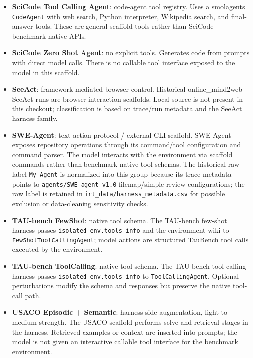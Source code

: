 \begin{itemize}
ScienceAgentBench self-debug scaffold asks the model to write complete Python
programs, then the harness executes/debugs externally and may feed error
messages back. The execution environment is not exposed as callable model
tools.
\item \textbf{SciCode Tool Calling Agent}: code-agent tool registry. Uses a
smolagents \texttt{CodeAgent} with web search, Python interpreter, Wikipedia
search, and final-answer tools. These are general scaffold tools rather than
SciCode benchmark-native APIs.
\item \textbf{SciCode Zero Shot Agent}: no explicit tools. Generates code from
prompts with direct model calls. There is no callable tool interface exposed to
the model in this scaffold.
\item \textbf{SeeAct}: framework-mediated browser control. Historical
online\_mind2web SeeAct runs are browser-interaction scaffolds. Local source is
not present in this checkout; classification is based on trace/run metadata and
the SeeAct harness family.
\item \textbf{SWE-Agent}: text action protocol / external CLI scaffold.
SWE-Agent exposes repository operations through its command/tool configuration
and command parser. The model interacts with the environment via scaffold
commands rather than benchmark-native tool schemas. The historical raw label
\texttt{My Agent} is normalized into this group because its trace metadata
points to \texttt{agents/SWE-agent-v1.0} filemap/simple-review configurations;
the raw label is retained in \texttt{irt\_data/harness\_metadata.csv} for
possible exclusion or data-cleaning sensitivity checks.
\item \textbf{TAU-bench FewShot}: native tool schema. The TAU-bench few-shot
harness passes \texttt{isolated\_env.tools\_info} and the environment wiki to
\texttt{FewShotToolCallingAgent}; model actions are structured TauBench tool
calls executed by the environment.
\item \textbf{TAU-bench ToolCalling}: native tool schema. The TAU-bench
tool-calling harness passes \texttt{isolated\_env.tools\_info} to
\texttt{ToolCallingAgent}. Optional perturbations modify the schema and
responses but preserve the native tool-call path.
\item \textbf{USACO Episodic + Semantic}: harness-side augmentation, light to
medium strength. The USACO scaffold performs solve and retrieval stages in the
harness. Retrieved examples or context are inserted into prompts; the model is
not given an interactive callable tool interface for the benchmark environment.
\end{itemize}
\endgroup

